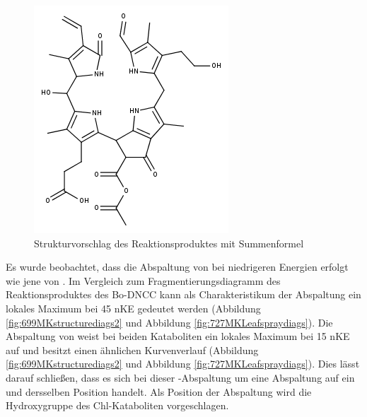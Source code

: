 \begin{figure}[!htbp]
  \centering
  \includegraphics[scale=0.5]{figures/Kapitel4/Kataboliten/fragmentation_structures/VWA_Katabolit_727.png}
  \caption[Strukturvorschlag des Reaktionsproduktes von Bo-NCC-3, Quelle: Author]{Strukturvorschlag des Reaktionsproduktes mit Summenformel }
  \label{fig:727MKstructure}
\end{figure}

Es wurde beobachtet, dass die Abspaltung von  bei niedrigeren Energien erfolgt wie jene von . Im Vergleich zum Fragmentierungsdiagramm des Reaktionsproduktes des Bo-DNCC kann als Charakteristikum der  Abspaltung ein lokales Maximum bei 45 \gls{nKE} gedeutet werden (Abbildung \ref{fig:699MKstructurediags2} und Abbildung \ref{fig:727MKLeafspraydiags}). Die Abspaltung von  weist bei beiden Kataboliten ein lokales Maximum bei 15 \gls{nKE} auf und besitzt einen ähnlichen Kurvenverlauf (Abbildung \ref{fig:699MKstructurediags2} und Abbildung \ref{fig:727MKLeafspraydiags}). Dies lässt darauf schließen, dass es sich bei dieser -Abspaltung um eine Abspaltung auf ein und dersselben Position handelt. Als Position der Abspaltung wird die Hydroxygruppe des Chl-Kataboliten vorgeschlagen. 

